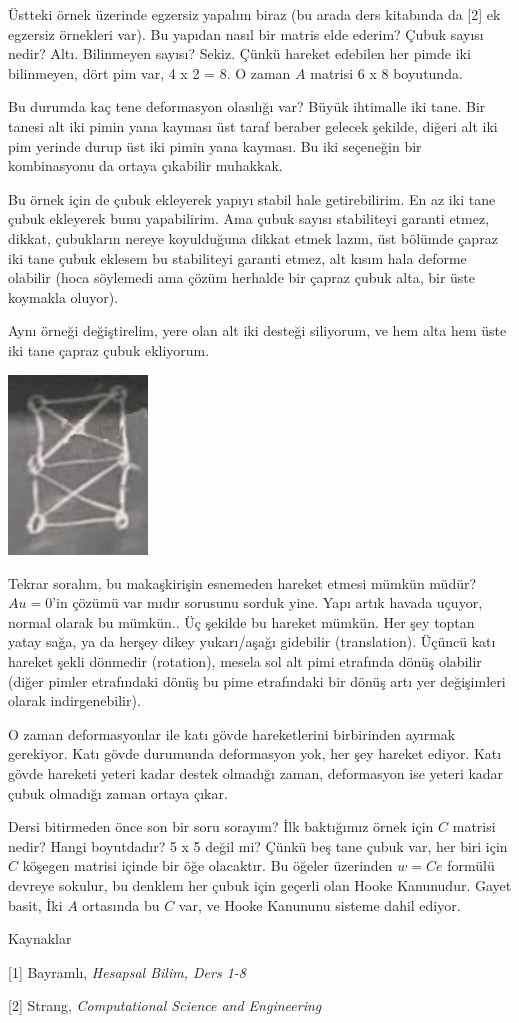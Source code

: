 \documentclass[12pt,fleqn]{article}\usepackage{../../common}
\begin{document}
Üstteki örnek üzerinde egzersiz yapalım biraz (bu arada ders kitabında da [2] ek
egzersiz örnekleri var). Bu yapıdan nasıl bir matris elde ederim? Çubuk sayısı
nedir? Altı. Bilinmeyen sayısı? Sekiz. Çünkü hareket edebilen her pimde
iki bilinmeyen, dört pim var, 4 x 2 = 8. O zaman $A$ matrisi 6 x 8 boyutunda.

Bu durumda kaç tene deformasyon olasılığı var? Büyük ihtimalle iki tane.  Bir
tanesi alt iki pimin yana kayması üst taraf beraber gelecek şekilde, diğeri
alt iki pim yerinde durup üst iki pimin yana kayması. Bu iki seçeneğin bir
kombinasyonu da ortaya çıkabilir muhakkak.

Bu örnek için de çubuk ekleyerek yapıyı stabil hale getirebilirim. En az iki
tane çubuk ekleyerek bunu yapabilirim. Ama çubuk sayısı stabiliteyi garanti
etmez, dikkat, çubukların nereye koyulduğuna dikkat etmek lazım, üst bölümde
çapraz iki tane çubuk eklesem bu stabiliteyi garanti etmez, alt kısım hala
deforme olabilir (hoca söylemedi ama çözüm herhalde bir çapraz çubuk alta, bir
üste koymakla oluyor).

Aynı örneği değiştirelim, yere olan alt iki desteği siliyorum, ve hem
alta hem üste iki tane çapraz çubuk ekliyorum. 

\includegraphics[width=10em]{compscieng_1_15_07.png}

Tekrar soralım, bu makaşkirişin esnemeden hareket etmesi mümkün müdür? $Au =
0$'in çözümü var mıdır sorusunu sorduk yine. Yapı artık havada uçuyor, normal
olarak bu mümkün.. Üç şekilde bu hareket mümkün. Her şey toptan yatay sağa, ya
da herşey dikey yukarı/aşağı gidebilir (translation). Üçüncü katı hareket şekli
dönmedir (rotation), mesela sol alt pimi etrafında dönüş olabilir (diğer pimler
etrafındaki dönüş bu pime etrafındaki bir dönüş artı yer değişimleri olarak
indirgenebilir).

O zaman deformasyonlar ile katı gövde hareketlerini birbirinden ayırmak
gerekiyor. Katı gövde durumunda deformasyon yok, her şey hareket ediyor.
Katı gövde hareketi yeteri kadar destek olmadığı zaman, deformasyon ise
yeteri kadar çubuk olmadığı zaman ortaya çıkar.

Dersi bitirmeden önce son bir soru sorayım? İlk baktığımız örnek için $C$
matrisi nedir? Hangi boyutdadır? 5 x 5 değil mi? Çünkü beş tane çubuk var, her
biri için $C$ köşegen matrisi içinde bir öğe olacaktır.  Bu öğeler üzerinden $w
= C e$ formülü devreye sokulur, bu denklem her çubuk için geçerli olan Hooke
Kanunudur. Gayet basit, İki $A$ ortasında bu $C$ var, ve Hooke Kanununu sisteme
dahil ediyor.

Kaynaklar

[1] Bayramlı, {\em Hesapsal Bilim, Ders 1-8}

[2] Strang, {\em Computational Science and Engineering}
\end{document}
